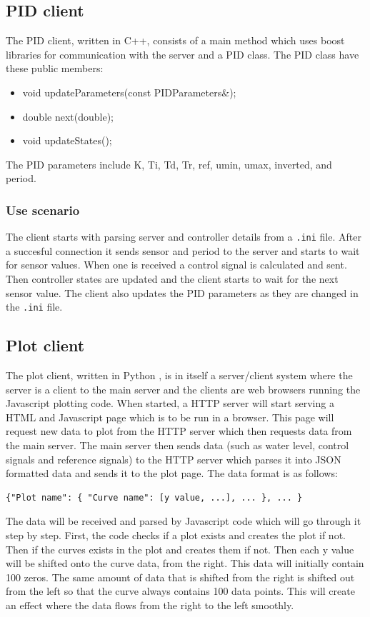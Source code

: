 \documentclass{article}
\begin{document}
\subsection{PID client}
The PID client, written in C++, consists of a main method which uses boost libraries for communication with the server and a PID class. The PID class have these public members:
\begin{itemize}
\item{void updateParameters(const PIDParameters\&);}
\item{double next(double);}
\item{void updateStates();}
\end{itemize}

The PID parameters include K, Ti, Td, Tr, ref, umin, umax, inverted, and period.

\subsubsection{Use scenario}
The client starts with parsing server and controller details from a \verb+.ini+ file. After a succesful connection it sends sensor and period to the server and starts to wait for sensor values. When one is received a control signal is calculated and sent. Then controller states are updated and the client starts to wait for the next sensor value. The client also updates the PID parameters as they are changed in the \verb+.ini+ file.


\subsection{Plot client}
The plot client, written in Python \cite{python}, is in itself a server/client
system where the server is a client to the main server and the clients are web
browsers running the Javascript plotting code. When started, a HTTP server will
start serving a HTML and Javascript page which is to be run in a browser. This
page will request new data to plot from the HTTP server which then requests data
from the main server. The main server then sends data (such as water level,
control signals and reference signals) to the HTTP server which parses it into
JSON \cite{json} formatted data and sends it to the plot page. The data format is
as follows:
\begin{verbatim}
{"Plot name": { "Curve name": [y value, ...], ... }, ... }
\end{verbatim}
The data will be received and parsed by Javascript code which will go through it
step by step. First, the code checks if a plot exists and creates the plot if
not. Then if the curves exists in the plot and creates them if not. Then each y
value will be shifted onto the curve data, from the right. This data will
initially contain 100 zeros. The same amount of data that is shifted from the
right is shifted out from the left so that the curve always contains 100
data points. This will create an effect where the data flows from the right to
the left smoothly.
\end{document}
